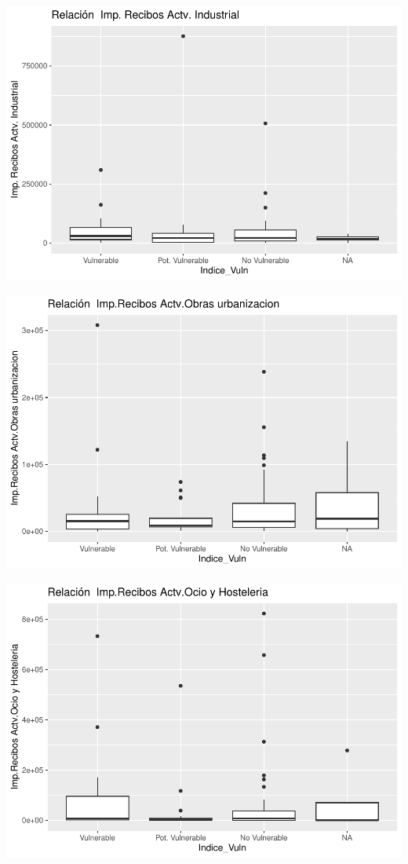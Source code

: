\documentclass[notspecified,article,submit,moreauthors,pdftex]{Definitions/mdpi}
\begin{document}
\begin{center}\includegraphics{./figure/unnamed-chunk-23-26} \end{center}

\begin{center}\includegraphics{./figure/unnamed-chunk-23-27} \end{center}

\begin{center}\includegraphics{./figure/unnamed-chunk-23-28} \end{center}
\end{document}
